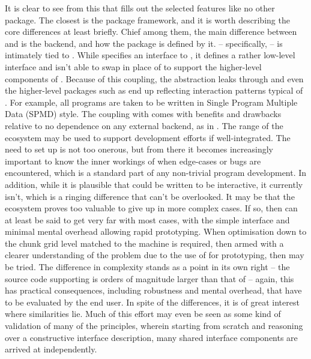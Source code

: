 It is clear to see from this that \lsr{} fills out the selected features like no other package.
The closest is the  package framework, and it is worth describing the core differences at least briefly.
Chief among them, the main difference between  and \lsr{} is the backend, and how the package is defined by it.
 -- specifically,  -- is intimately tied to . 
While  specifies an interface to , it defines a rather low-level interface and isn't able to swap in place of  to support the higher-level components of .
Because of this coupling, the abstraction leaks through and even the higher-level packages such as  end up reflecting interaction patterns typical of .
For example, all programs are taken to be written in Single Program Multiple Data (SPMD) style\cite{strout2006data}.
The coupling with  comes with benefits and drawbacks relative to no dependence on any external backend, as in \lsr{}.
The range of the  ecosystem may be used to support development efforts if well-integrated.
The need to set up  is not too onerous, but from there it becomes increasingly important to know the inner workings of  when edge-cases or bugs are encountered, which is a standard part of any non-trivial program development.
In addition, while it is plausible that  could be written to be interactive, it currently isn't, which is a ringing difference that can't be overlooked.
It may be that the  ecosystem proves too valuable to give up in more complex cases.
If so, then \lsr{} can at least be said to get very far with most cases, with the simple interface and minimal mental overhead allowing rapid prototyping.
When optimisation down to the chunk grid level matched to the machine is required, then armed with a clearer understanding of the problem due to the use of \lsr{} for prototyping, then  may be tried.
The difference in complexity stands as a point in its own right -- the source code supporting  is orders of magnitude larger than that of \lsr{} -- again, this has practical consequences, including robustness and mental overhead, that have to be evaluated by the end user.
In spite of the differences, it is of great interest where similarities lie.
Much of this effort may even be seen as some kind of validation of many of the  principles, wherein starting from scratch and reasoning over a constructive interface description, many shared interface components are arrived at independently.

